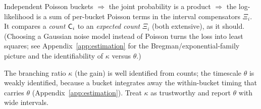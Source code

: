 \begin{intuition}
Independent Poisson buckets $\Rightarrow$ the joint probability is a product
$\Rightarrow$ the log-likelihood is a sum of per-bucket Poisson terms in the
interval compensators $\Xi_i$. It compares a \emph{count} $\mathsf{C}_i$ to an
\emph{expected count} $\Xi_i$ (both extensive), as it should. (Choosing a Gaussian
noise model instead of Poisson turns the loss into least squares; see
Appendix~\ref{app:estimation} for the Bregman/exponential-family picture and the
identifiability of $\kappa$ versus $\theta$.)
\end{intuition}

\begin{remark}
The branching ratio $\kappa$ (the gain) is well identified from counts; the
timescale $\theta$ is weakly identified, because a bucket integrates away the
within-bucket timing that carries $\theta$
(Appendix~\ref{app:estimation}). Treat $\kappa$ as trustworthy and report $\theta$
with wide intervals.
\end{remark}
